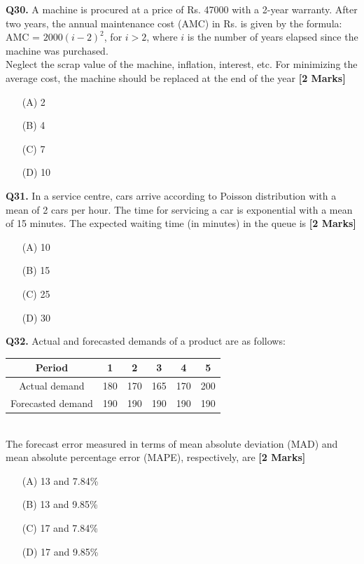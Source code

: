 \documentclass[11pt]{article}
\newcommand{\questionb}[2]{
    \noindent\textbf{Q#2.} #1 \hfill \textbf{[2 Marks]}
}
\begin{document}
\questionb{A machine is procured at a price of Rs. 47000 with a 2-year warranty. After two years, the annual maintenance cost (AMC) in Rs. is given by the formula: \\
AMC = \( 2000(i - 2)^2 \), for \( i > 2 \), where \( i \) is the number of years elapsed since the machine was purchased. \\
Neglect the scrap value of the machine, inflation, interest, etc. For minimizing the average cost, the machine should be replaced at the end of the year}{30}
\begin{enumerate}
    \item[(A)] 2
    \item[(B)] 4
    \item[(C)] 7
    \item[(D)] 10
\end{enumerate}
\vspace{0.5cm}

\questionb{In a service centre, cars arrive according to Poisson distribution with a mean of 2 cars per hour. The time for servicing a car is exponential with a mean of 15 minutes. The expected waiting time (in minutes) in the queue is}{31}
\begin{enumerate}
    \item[(A)] 10
    \item[(B)] 15
    \item[(C)] 25
    \item[(D)] 30
\end{enumerate}
\vspace{0.5cm}

\questionb{Actual and forecasted demands of a product are as follows:\\

\begin{tabular}{|c|c|c|c|c|c|}
\hline
Period & 1 & 2 & 3 & 4 & 5 \\
\hline
Actual demand & 180 & 170 & 165 & 170 & 200 \\
\hline
Forecasted demand & 190 & 190 & 190 & 190 & 190 \\
\hline
\end{tabular}\\

The forecast error measured in terms of mean absolute deviation (MAD) and mean absolute percentage error (MAPE), respectively, are}{32}
\begin{enumerate}
    \item[(A)] 13 and 7.84\%
    \item[(B)] 13 and 9.85\%
    \item[(C)] 17 and 7.84\%
    \item[(D)] 17 and 9.85\%
\end{enumerate}
\vspace{0.5cm}
\end{document}
